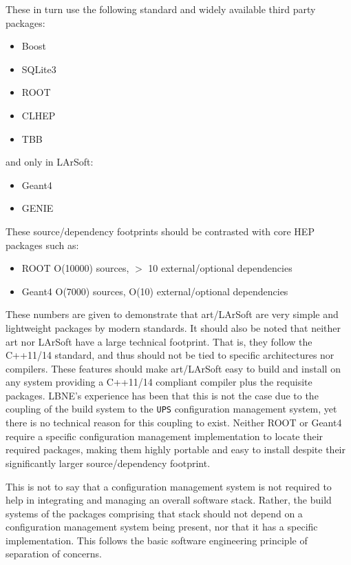\documentclass[usletter]{article}
\newcommand{\code}[1]{\texttt{#1}}
\newcommand{\ups}{\code{UPS}\xspace}
\newcommand{\art}{art\xspace}
\newcommand{\larsoft}{LArSoft\xspace}
\begin{document}
These in turn use the following standard and widely available third party packages:
\begin{itemize}

	\item Boost
	\item SQLite3
	\item ROOT
	\item CLHEP
	\item TBB

\end{itemize}
and only in LArSoft:

\begin{itemize}

	\item Geant4
	\item GENIE

\end{itemize}

These source/dependency footprints should be contrasted with core HEP
packages such as:

\begin{itemize}

	\item ROOT O(10000) sources, $>$ 10 external/optional dependencies
	\item Geant4 O(7000) sources, O(10) external/optional dependencies

\end{itemize}

These numbers are given to demonstrate that \art/\larsoft are very simple and
lightweight packages by modern standards. It should also be noted that
neither \art nor \larsoft have a large technical footprint. That is,
they follow the C++11/14 standard, and thus should not be tied to specific
architectures nor compilers.
These features should make \art/\larsoft easy to build and install on any
system providing a C++11/14 compliant compiler plus the requisite packages.
LBNE's experience has been that this is not the case due to the coupling
of the build system to the \ups configuration management system, yet there
is no technical reason for this coupling to exist.
Neither ROOT or Geant4 require a specific configuration management
implementation to locate their required packages, making them highly portable
and easy to install despite their significantly larger source/dependency
footprint.

This is not to say that a configuration management system is not required
to help in integrating and managing an overall software stack.
Rather, the build systems of the packages comprising that stack should not
depend on a configuration management system being present, nor that it has a
specific implementation. This follows the basic software engineering
principle of separation of concerns.
\end{document}
